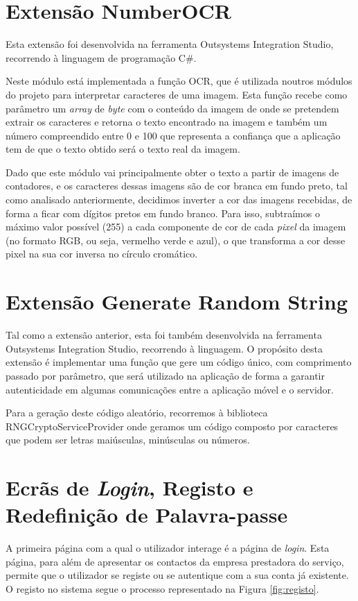 \section{Extensão NumberOCR } \label{numberocr} %
Esta extensão foi desenvolvida na ferramenta Outsystems Integration Studio, recorrendo à linguagem de programação C\#.\par
Neste módulo está implementada a função OCR, que é utilizada noutros módulos do projeto para interpretar caracteres de uma imagem. Esta função recebe como parâmetro um \textit{array} de \textit{byte} com o conteúdo da imagem de onde se pretendem extrair os caracteres e retorna o texto encontrado na imagem e também um número compreendido entre 0 e 100 que representa a confiança que a aplicação tem de que o texto obtido será o texto real da imagem.\par
Dado que este módulo vai principalmente obter o texto a partir de imagens de contadores, e os caracteres dessas imagens são de cor branca em fundo preto, tal como analisado anteriormente, decidimos inverter a cor das imagens recebidas, de forma a ficar com dígitos pretos em fundo branco. Para isso, subtraímos o máximo valor possível (255) a cada componente de cor de cada \textit{pixel} da imagem (no formato RGB, ou seja, vermelho verde e azul), o que transforma a cor desse pixel na sua cor inversa no círculo cromático.

\section{Extensão Generate Random String } \label{randoms} %
Tal como a extensão anterior, esta foi também desenvolvida na ferramenta Outsystems Integration Studio, recorrendo à linguagem.
O propósito desta extensão é implementar uma função que gere um código único, com comprimento passado por parâmetro, que será utilizado na aplicação de forma a garantir autenticidade em algumas comunicações entre a aplicação móvel e o servidor.\par
Para a geração deste código aleatório, recorremos à biblioteca RNGCryptoServiceProvider \cite{RNGCryptoServiceProvider} onde geramos um código composto por caracteres que podem ser letras maiúsculas, minúsculas ou números.


\section{Ecrãs de \textit{Login}, Registo e Redefinição de Palavra-passe} \label{ecra:login} %
A primeira página com a qual o utilizador interage é a página de \textit{login}. Esta página, para além de apresentar os contactos da empresa prestadora do serviço, permite que o utilizador se registe ou se autentique com a sua conta já existente.
O registo no sistema segue o processo representado na Figura \ref{fig:registo}.

